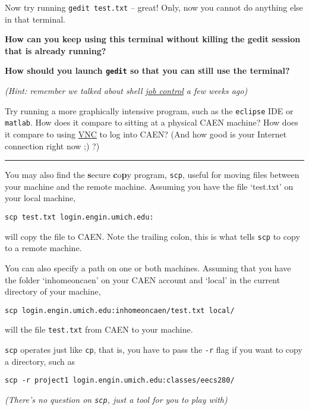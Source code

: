 \documentclass{article}
\begin{document}
Now try running \texttt{gedit test.txt} -- great! Only, now you cannot do
anything else in that terminal.

\textbf{How can you keep using this terminal without killing the gedit session
  that is already running?}

\textbf{How should you launch \texttt{gedit} so that you can still use the
  terminal?}

\emph{\small (Hint: remember we talked about shell \ul{job control} a few
  weeks ago)}
\vspace{6em}

Try running a more graphically intensive program, such as the \texttt{eclipse}
IDE or \texttt{matlab}. How does it compare to sitting at a physical CAEN
machine? How does it compare to using
\href{http://caenfaq.engin.umich.edu/12374-Linux-Login-Service/how-do-i-connect-to-a-caen-linux-computer-remotely}{VNC}
to log into CAEN? (And how good is your Internet connection right now ;) ?)

\bigskip
\hrule
You may also find the \textbf{s}ecure \textbf{c}o\textbf{p}y program,
\texttt{scp}, useful for moving files between your machine and the remote
machine. Assuming you have the file `test.txt' on your local machine,

\texttt{scp~test.txt~login.engin.umich.edu:}

will copy the file to CAEN. Note the trailing colon, this is what tells
\texttt{scp} to copy to a remote machine.

You can also specify a path on one or both machines. Assuming that you have
the folder `inhomeoncaen' on your CAEN account and `local' in the current
directory of your machine,

\texttt{scp~login.engin.umich.edu:inhomeoncaen/test.txt~local/}

will the file \texttt{test.txt} from CAEN to your machine.

\texttt{scp} operates just like \texttt{cp}, that is, you have to pass the
\texttt{-r} flag if you want to copy a directory, such as

\texttt{scp~-r~project1~login.engin.umich.edu:classes/eecs280/}

\emph{(There's no question on \texttt{scp}, just a tool for you to play with)}
\end{document}
